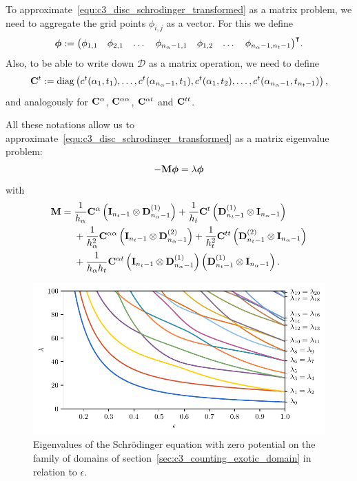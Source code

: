 To approximate~\eqref{equ:c3_disc_schrodinger_transformed} as a matrix problem, we need to aggregate the grid points $\phi_{i,j}$ as a vector. For this we define
$$
  \vb*{\phi} := {\begin{pmatrix}
      \phi_{1,1} & \phi_{2,1} & \dots & \phi_{n_\alpha-1, 1} & \phi_{1,2} & \dots & \phi_{n_\alpha-1, n_t-1}
    \end{pmatrix}}^\intercal\text{.}
$$
Also, to be able to write down $\mathcal{D}$ as a matrix operation, we need to define
$$
  \vb{C}^{t} := \operatorname{diag}\left(
      c^{t}(\alpha_1, t_1) , \dots , c^{t}(\alpha_{n_\alpha-1}, t_1) , c^{t}(\alpha_1, t_2) , \dots , c^{t}(\alpha_{n_\alpha-1}, t_{n_t-1})
    \right)\text{,}
$$
and analogously for $\vb{C}^{\alpha}$, $\vb{C}^{\alpha\alpha}$, $\vb{C}^{\alpha t}$ and $\vb{C}^{t t}$.

All these notations allow us to approximate~\eqref{equ:c3_disc_schrodinger_transformed} as a matrix eigenvalue problem:
$$
  -\vb{M} \vb*{\phi} = \lambda \vb*{\phi}
$$
with
\begin{align*}
  \vb{M} = {} & \frac{1}{h_\alpha} \vb{C}^{\alpha} \left(\vb{I}_{n_t - 1}\otimes \vb{D}^{(1)}_{n_\alpha - 1} \right) + \frac{1}{h_t} \vb{C}^{t} \left(\vb{D}^{(1)}_{n_t - 1}  \otimes \vb{I}_{n_\alpha - 1}\right)                \\
              & {} + \frac{1}{h_\alpha^2} \vb{C}^{\alpha\alpha} \left(\vb{I}_{n_t - 1}\otimes \vb{D}^{(2)}_{n_\alpha - 1}\right) + \frac{1}{h_t^2} \vb{C}^{tt} \left(\vb{D}^{(2)}_{n_t - 1}  \otimes \vb{I}_{n_\alpha - 1}\right) \\
              & {} + \frac{1}{h_\alpha h_t} \vb{C}^{\alpha t} \left(\vb{I}_{n_t - 1}\otimes \vb{D}^{(1)}_{n_\alpha - 1} \right) \left( \vb{D}^{(1)}_{n_t - 1}  \otimes \vb{I}_{n_\alpha - 1} \right)\text{.}
\end{align*}

\begin{figure}
  \begin{center}
    \includegraphics[width=\textwidth]{img/chapter3/on_disc/eigenvalues_flow.pdf}
    \caption{Eigenvalues of the Schrödinger equation with zero potential on the family of domains of section~\ref{sec:c3_counting_exotic_domain} in relation to $\epsilon$.}
    \label{fig:c3_disc_eigenvalues_flow}
  \end{center}
\end{figure}


